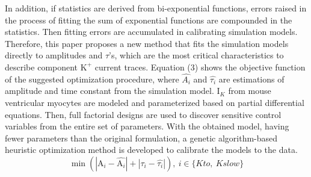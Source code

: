 \documentclass[journal]{IEEEtran}
\begin{document}
In addition, if statistics are derived from bi-exponential functions, errors raised in the process of fitting the sum of exponential functions are compounded in the statistics. Then fitting errors are accumulated in calibrating simulation models. Therefore, this paper proposes a new method that fits the simulation models directly to amplitudes and $\tau$'s, which are the most critical characteristics to describe component $\text{K}^{+}$ current traces. Equation (3) shows the objective function of the suggested optimization procedure, where $\hat{A_i}$ and $\hat{\tau_i}$ are estimations of amplitude and time constant from the simulation model. $\text{I}_{K}$ from mouse ventricular myocytes are modeled and parameterized based on partial differential equations. Then, full factorial designs are used to discover sensitive control variables from the entire set of parameters. With the obtained model, having fewer parameters than the original formulation, a genetic algorithm-based heuristic optimization method is developed to calibrate the models to the data.
\begin{equation}
    \min (|\text{A}_i - \hat{\text{A}_i}| + |\tau_i - \hat{\tau_i}|), \ i \in \{Kto,\ Kslow\}
\end{equation}
\end{document}
